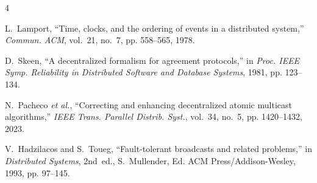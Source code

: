 \documentclass[conference]{IEEEtran}
\begin{document}
\begin{thebibliography}{4}

L.~Lamport, ``Time, clocks, and the ordering of events in a distributed
system,'' \emph{Commun. ACM}, vol.~21, no.~7, pp. 558--565, 1978.

D.~Skeen, ``A decentralized formalism for agreement protocols,'' in
\emph{Proc. IEEE Symp. Reliability in Distributed Software and Database
Systems}, 1981, pp. 123--134.

N.~Pacheco \emph{et al.}, ``Correcting and enhancing decentralized atomic
multicast algorithms,'' \emph{IEEE Trans. Parallel Distrib. Syst.}, vol.~34,
no.~5, pp. 1420--1432, 2023.

V.~Hadzilacos and S.~Toueg, ``Fault-tolerant broadcasts and related
problems,'' in \emph{Distributed Systems}, 2nd~ed., S.~Mullender, Ed.
ACM Press/Addison-Wesley, 1993, pp. 97--145.

\end{thebibliography}
\end{document}
